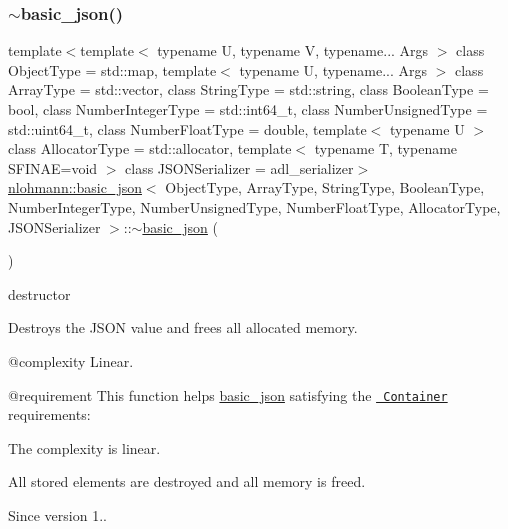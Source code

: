 \subsubsection{\texorpdfstring{$\sim$basic\_json()}{~basic\_json()}}
{\footnotesize\ttfamily template$<$template$<$ typename U, typename V, typename... Args $>$ class Object\+Type = std\+::map, template$<$ typename U, typename... Args $>$ class Array\+Type = std\+::vector, class String\+Type  = std\+::string, class Boolean\+Type  = bool, class Number\+Integer\+Type  = std\+::int64\+\_\+t, class Number\+Unsigned\+Type  = std\+::uint64\+\_\+t, class Number\+Float\+Type  = double, template$<$ typename U $>$ class Allocator\+Type = std\+::allocator, template$<$ typename T, typename S\+F\+I\+N\+A\+E=void $>$ class J\+S\+O\+N\+Serializer = adl\+\_\+serializer$>$ \\
\mbox{\hyperlink{classnlohmann_1_1basic__json}{nlohmann\+::basic\+\_\+json}}$<$ Object\+Type, Array\+Type, String\+Type, Boolean\+Type, Number\+Integer\+Type, Number\+Unsigned\+Type, Number\+Float\+Type, Allocator\+Type, J\+S\+O\+N\+Serializer $>$\+::$\sim$\mbox{\hyperlink{classnlohmann_1_1basic__json}{basic\+\_\+json}} (\begin{DoxyParamCaption}{ }\end{DoxyParamCaption})\hspace{0.3cm}{\ttfamily [inline]}}



destructor 

Destroys the J\+S\+ON value and frees all allocated memory.

@complexity Linear.

@requirement This function helps {\ttfamily \mbox{\hyperlink{classnlohmann_1_1basic__json}{basic\+\_\+json}}} satisfying the \href{http://en.cppreference.com/w/cpp/concept/Container}{\texttt{ Container}} requirements\+:
\begin{DoxyItemize}
\item The complexity is linear.
\item All stored elements are destroyed and all memory is freed.
\end{DoxyItemize}

\begin{DoxySince}{Since}
version 1.. 
\end{DoxySince}


